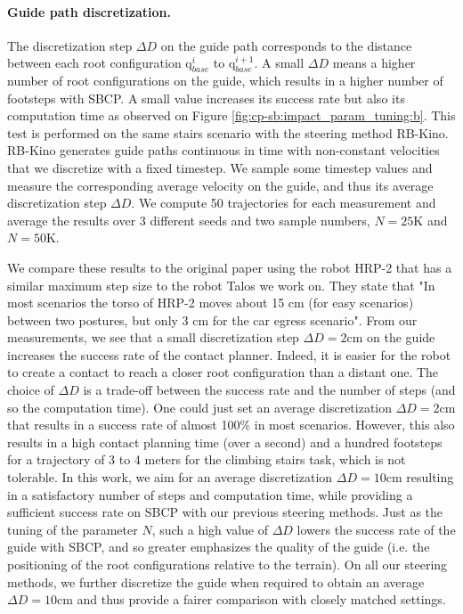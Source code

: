 \paragraph{Guide path discretization.}
The discretization step $\Delta D$ on the guide path corresponds to the distance between each root configuration q$_{base}^i$ to q$_{base}^{i+1}$. A small $\Delta D$ means a higher number of root configurations on the guide, which results in a higher number of footsteps with SBCP. 
A small value increases its success rate but also its computation time as observed on Figure \ref{fig:cp-sb:impact_param_tuning:b}.
This test is performed on the same stairs scenario with the steering method RB-Kino. 
RB-Kino generates guide paths continuous in time with non-constant velocities that
we discretize with a fixed timestep. 
We sample some timestep values and measure the corresponding average velocity on the guide, and thus its average discretization step $\Delta D$.
We compute 50 trajectories for each measurement and average the results over 3 different seeds and two sample numbers, $N=25$K and $N=50$K. 

We compare these results to the original paper \cite{AcyclicCP} using the robot HRP-2 that has a similar maximum step size to the robot Talos we work on. They state that "In most scenarios the torso of HRP-2 moves about 15 cm (for easy scenarios) between two postures, but only 3 cm for the car egress scenario". 
From our measurements, we see that a small discretization step $\Delta D=2$cm on the guide increases the success rate of the contact planner. 
Indeed, it is easier for the robot to create a contact to reach a closer root configuration than a distant one.
The choice of $\Delta D$ is a trade-off between the success rate and the number of steps (and so the computation time). 
One could just set an average discretization $\Delta D=2$cm that results in a success rate of almost 100\% in most scenarios. However, this also results in a high contact planning time (over a second) and a hundred footsteps for a trajectory of 3 to 4 meters for the climbing stairs task, which is not tolerable.
In this work, we aim for an average discretization $\Delta D=10$cm resulting in a satisfactory number of steps and computation time, while providing a sufficient success rate on SBCP with our previous steering methods. 
Just as the tuning of the parameter $N$, such a high value of $\Delta D$ lowers the success rate of the guide with SBCP, and so greater emphasizes the quality of the guide (i.e. the positioning of the root configurations relative to the terrain).
On all our steering methods, we further discretize the guide when required to obtain an average $\Delta D=10$cm and thus provide a fairer comparison with closely matched settings.


